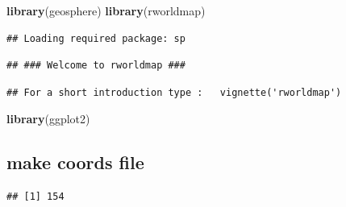 \documentclass[]{article}
\newenvironment{Shaded}{\begin{snugshade}}{\end{snugshade}}
\newcommand{\KeywordTok}[1]{\textcolor[rgb]{0.13,0.29,0.53}{\textbf{#1}}}
\newcommand{\StringTok}[1]{\textcolor[rgb]{0.31,0.60,0.02}{#1}}
\newcommand{\CommentTok}[1]{\textcolor[rgb]{0.56,0.35,0.01}{\textit{#1}}}
\newcommand{\OperatorTok}[1]{\textcolor[rgb]{0.81,0.36,0.00}{\textbf{#1}}}
\newcommand{\NormalTok}[1]{#1}
\begin{document}
\begin{Shaded}
\begin{Highlighting}[]
\KeywordTok{library}\NormalTok{(geosphere)}
\KeywordTok{library}\NormalTok{(rworldmap)}
\end{Highlighting}
\end{Shaded}

\begin{verbatim}
## Loading required package: sp
\end{verbatim}

\begin{verbatim}
## ### Welcome to rworldmap ###
\end{verbatim}

\begin{verbatim}
## For a short introduction type :   vignette('rworldmap')
\end{verbatim}

\begin{Shaded}
\begin{Highlighting}[]
\KeywordTok{library}\NormalTok{(ggplot2)}
\end{Highlighting}
\end{Shaded}

\subsection{make coords file}\label{make-coords-file}

\begin{Shaded}
\end{Shaded}

\begin{verbatim}
## [1] 154
\end{verbatim}
\end{document}

